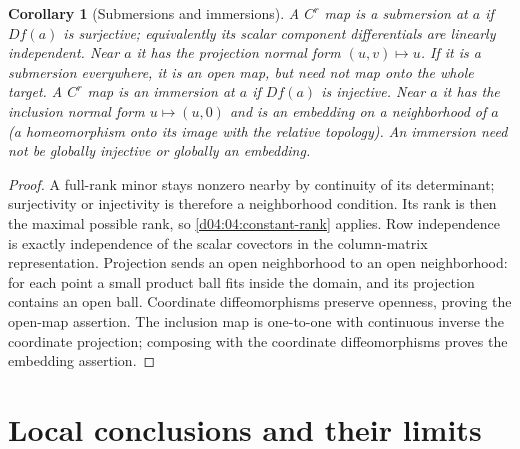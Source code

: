 \documentclass[11pt,oneside,openany]{book}
\newtheorem{corollary}[theorem]{Corollary}
\theoremstyle{definition}
\theoremstyle{remark}
\newcommand{\family}[1]{}
\begin{document}
\begin{corollary}[Submersions and immersions]\label{d04:04:submersion-immersion}
A $C^r$ map is a submersion at $a$ if $Df(a)$ is surjective; equivalently
its scalar component differentials are linearly independent. Near $a$ it
has the projection normal form $(u,v)\mapsto u$. If it is a submersion
everywhere, it is an open map, but need not map onto the whole target.
A $C^r$ map is an immersion at $a$ if $Df(a)$ is injective. Near $a$ it
has the inclusion normal form $u\mapsto(u,0)$ and is an embedding on a
neighborhood of $a$ (a homeomorphism onto its image with the relative topology).
An immersion need not be globally injective or globally an embedding.
\end{corollary}
\begin{proof}
A full-rank minor stays nonzero nearby by continuity of its determinant;
surjectivity or injectivity is therefore a neighborhood condition. Its rank
is then the maximal possible rank, so \cref{d04:04:constant-rank} applies.
Row independence is exactly independence of the scalar covectors in the
column-matrix representation. Projection sends an open neighborhood to an
open neighborhood: for each point a small product ball fits inside the
domain, and its projection contains an open ball. Coordinate diffeomorphisms
preserve openness, proving the open-map assertion. The inclusion map is
one-to-one with continuous inverse the coordinate projection; composing
with the coordinate diffeomorphisms proves the embedding assertion.
\end{proof}

\section{Local conclusions and their limits}
\family{K04.04.12}
\end{document}
